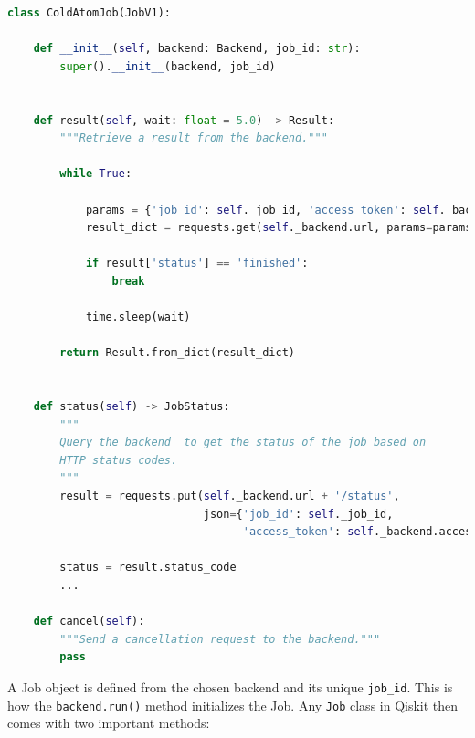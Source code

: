 \documentclass[a4paper, 10pt]{article}
\newcommand{\co}[1]{\texttt{#1}}
\begin{document}
\begin{minipage}{\linewidth}
\begin{lstlisting}[language=Python, caption = Job class that encapsulates information about the job submitted to the backend, label = {lst:job_class}]
class ColdAtomJob(JobV1):

    def __init__(self, backend: Backend, job_id: str):
        super().__init__(backend, job_id)


    def result(self, wait: float = 5.0) -> Result:
        """Retrieve a result from the backend."""
        
        while True:

            params = {'job_id': self._job_id, 'access_token': self._backend.access_token}
            result_dict = requests.get(self._backend.url, params=params).json()

            if result['status'] == 'finished':
                break
                
            time.sleep(wait)
                
        return Result.from_dict(result_dict)


    def status(self) -> JobStatus:
        """
        Query the backend  to get the status of the job based on 
        HTTP status codes.
        """
        result = requests.put(self._backend.url + '/status',
                              json={'job_id': self._job_id,
                                    'access_token': self._backend.access_token})

        status = result.status_code
        ...
        
    def cancel(self):
        """Send a cancellation request to the backend."""
        pass
\end{lstlisting}
\end{minipage}

A Job object is defined from the chosen backend and its unique \co{job\_id}. This is how the \co{backend.run()} method initializes the Job. Any \co{Job} class in Qiskit then comes with two important methods:
\end{document}
